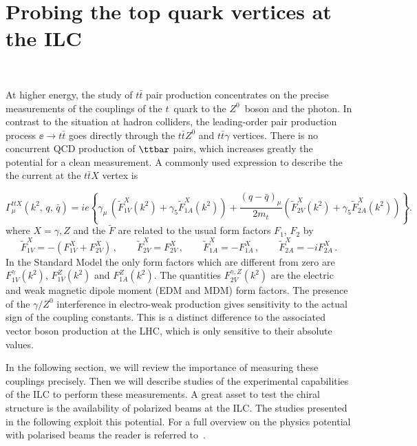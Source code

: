 \section{Probing the top quark vertices at the ILC}~\label{sec:top-elweak}

At higher energy, the study of $t\bar t$ pair production concentrates on the precise measurements of the couplings
of the $t$~quark to the $Z^0$~boson and the photon. 
 In contrast to the situation  at hadron colliders, the leading-order pair production process
$\ee\to t\bar t$ goes directly through the $t\bar{t} Z^0$ and 
$t\bar{t} \gamma$ vertices.  There is no concurrent QCD production 
of $\ttbar$ pairs, which increases greatly the potential for a clean measurement.
A commonly used expression to describe the  the current at the $t\bar{t} X$ vertex is~\cite{Juste:2006sv}

\begin{equation}\label{eq:gordon}
\Gamma_\mu^{ttX}(k^2,\,q,\,\bar{q}) = ie \left\{
  \gamma_\mu \, \left(  \widetilde{F}_{1V}^X(k^2)
                      + \gamma_5\widetilde{F}_{1A}^X(k^2) \right)
+ \frac{(q-\bar{q})_\mu}{2m_t}
    \left(  \widetilde{F}_{2V}^X(k^2)
          + \gamma_5\widetilde F_{2A}^X(k^2) \right)
\right\} .
\end{equation}
where $X = \gamma,Z$ and the  $\widetilde{F}$ are related to the usual
form factors $F_1$, $F_2$ by 
\begin{equation}
\label{eq:rel1}
\widetilde F^X_{1V} = -\left( F^X_{1V}+F^X_{2V} \right) \, , \qquad
\widetilde F^X_{2V}  =  F^X_{2V} \, , \qquad
\widetilde F^X_{1A} = -F^X_{1A} \, , \qquad
\widetilde F^X_{2A} =  -iF^X_{2A} \, .
\end{equation}
In the Standard Model the only form factors which are different 
from zero are $F_{1V}^\gamma(k^2),\,F_{1V}^{Z}(k^2)$ and $F_{1A}^{Z}(k^2)$.  The
quantities $F_{2V}^{\gamma,Z}(k^2)$ are the electric and weak magnetic dipole 
moment (EDM and MDM) form factors. The presence of the $\gamma/Z^0$ interference in electro-weak production gives sensitivity to the actual sign of the coupling constants. This is a distinct difference to the associated vector boson production at the LHC, which is only sensitive to their absolute values. 


In the following section, we will review the importance of measuring these couplings precisely.   Then we will describe studies of the experimental  capabilities of the ILC to perform these measurements. A great asset to test the chiral structure is the availability of polarized beams at the ILC. The studies presented in the following exploit this potential. For a full overview on the physics potential with polarised beams the reader is referred to~\cite{MoortgatPick:2005cw}.

